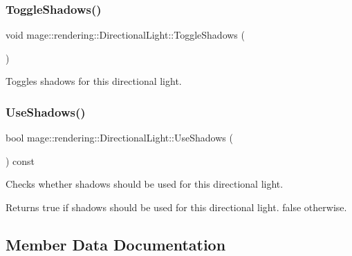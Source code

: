 \subsubsection{\texorpdfstring{Toggle\+Shadows()}{ToggleShadows()}}
{\footnotesize\ttfamily void mage\+::rendering\+::\+Directional\+Light\+::\+Toggle\+Shadows (\begin{DoxyParamCaption}{ }\end{DoxyParamCaption})\hspace{0.3cm}{\ttfamily [noexcept]}}

Toggles shadows for this directional light. \hypertarget{classmage_1_1rendering_1_1_directional_light_a129904147256d111ec56cc3ddc502157}{}\label{classmage_1_1rendering_1_1_directional_light_a129904147256d111ec56cc3ddc502157} 
\subsubsection{\texorpdfstring{Use\+Shadows()}{UseShadows()}}
{\footnotesize\ttfamily bool mage\+::rendering\+::\+Directional\+Light\+::\+Use\+Shadows (\begin{DoxyParamCaption}{ }\end{DoxyParamCaption}) const\hspace{0.3cm}{\ttfamily [noexcept]}}

Checks whether shadows should be used for this directional light.

\begin{DoxyReturn}{Returns}
{\ttfamily true} if shadows should be used for this directional light. {\ttfamily false} otherwise. 
\end{DoxyReturn}


\subsection{Member Data Documentation}
\hypertarget{classmage_1_1rendering_1_1_directional_light_a1ef1bf05b2750b7de8f722db30a2398f}{}\label{classmage_1_1rendering_1_1_directional_light_a1ef1bf05b2750b7de8f722db30a2398f} 
